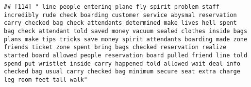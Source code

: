 \documentclass[
]{article}
\begin{document}
\begin{verbatim}
## [114] " line people entering plane fly spirit problem staff incredibly rude check boarding customer service abysmal reservation carry checked bag check attendants determined make lives hell spent bag check attendant told saved money vacuum sealed clothes inside bags plans make tips tricks save money spirit attendants boarding made zone friends ticket zone spent bring bags checked reservation realize started board allowed people reservation board pulled friend line told spend put wristlet inside carry happened told allowed wait deal info checked bag usual carry checked bag minimum secure seat extra charge leg room feet tall walk"                                                                                                                                                                                                                                                                                                                                                                                                                                                                                                                                                                                                                                                                                                                                                                                                                                                                                                                                                                                                                                                                                                                                          

\end{verbatim}
\end{document}
